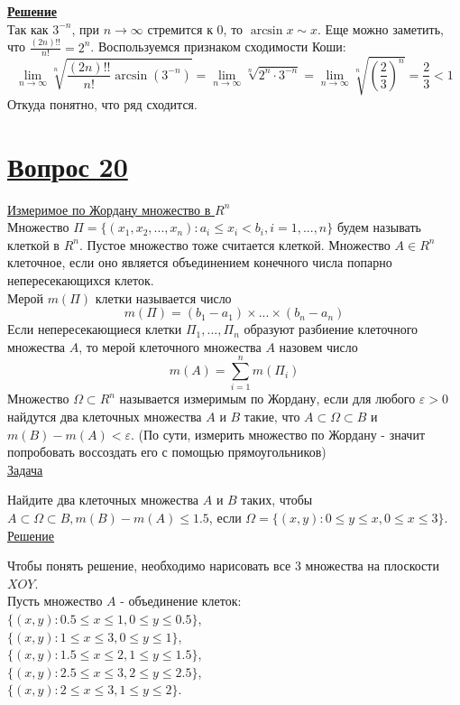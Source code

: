 \documentclass{report}
\begin{document}
\textbf{\uline{Решение}}\\
Так как $3^{-n}$, при $n \to \infty$ стремится к $0$, то $\arcsin{x} \sim x$.
Еще можно заметить, что $\frac{(2n)!!}{n!} = 2^n$.
Воспользуемся признаком сходимости Коши:
$$\lim\limits_{n \to \infty} \sqrt[n]{\frac{(2n)!!}{n!} \arcsin{(3^{-n})}} = \lim\limits_{n \to \infty} \sqrt[n]{2^n \cdot 3^{-n}} = \lim\limits_{n \to \infty} \sqrt[n]{\left(\frac{2}{3}\right)^n} = \frac{2}{3} < 1$$
Откуда понятно, что ряд сходится.

\newpage
\section{\underline{Вопрос 20}}
\underline{Измеримое по Жордану множество в $R^{n}$}\\

Множество $\Pi = \{(x_{1}, x_{2}, ... , x_{n}): a_{i} \leq x_{i} < b_{i}, i = 1, ... , n\}$ будем называть клеткой в $R^{n}$. Пустое множество тоже считается клеткой. Множество $A\in R^{n}$ клеточное, если оно является объединением конечного числа попарно непересекающихся клеток. \\
Мерой $m(\Pi)$ клетки называется число
\[m(\Pi) = (b_{1} - a_{1})\times...\times(b_{n} - a_{n})\]
Если непересекающиеся клетки $\Pi_{1}, ..., \Pi_{n}$ образуют разбиение клеточного множества $A$, то мерой клеточного множества $A$ назовем число
\[m(A) = \sum_{i = 1}^{n} m(\Pi_{i})\]
Множество $\Omega\subset R^{n}$ называется измеримым по Жордану, если для любого $\varepsilon > 0$ найдутся два клеточных множества $A$ и $B$ такие, что $A\subset\Omega\subset B$ и $m(B) - m(A) <\varepsilon$. (По сути, измерить множество по Жордану - значит попробовать воссоздать его с помощью прямоугольников)\\

\underline{Задача}

Найдите два клеточных множества $A$ и $B$ таких, чтобы $A\subset\Omega\subset B, m(B) - m(A) \leq 1.5$, если $\Omega = \{(x,y): 0\leq y \leq x, 0 \leq x \leq 3\}$.\\

\underline{Решение}

Чтобы понять решение, необходимо нарисовать все 3 множества на плоскости $XOY$.\\

Пусть множество $A$ - объединение клеток:\\
$\{(x, y): 0.5 \leq x \leq 1, 0 \leq y \leq 0.5\}$,\\
$\{(x, y): 1 \leq x \leq 3, 0 \leq y \leq 1\}$,\\
$\{(x, y): 1.5 \leq x \leq 2, 1 \leq y \leq 1.5\}$,\\
$\{(x, y): 2.5 \leq x \leq 3, 2 \leq y \leq 2.5\}$,\\
$\{(x, y): 2 \leq x \leq 3, 1 \leq y \leq 2\}$.
\end{document}
